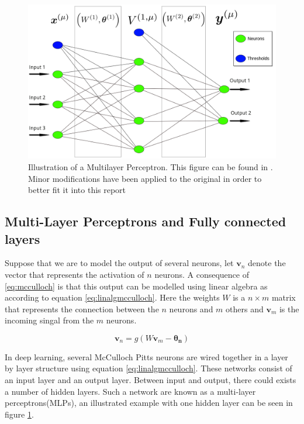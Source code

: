 \begin{figure}
    \centering
    \includegraphics[scale=1.3]{figure/neural_network1.png}
    \caption{Illustration of a Multilayer Perceptron. This figure can be found in \cite{barkdeep}. Minor modifications have been applied to the original in order to better fit it into this report}
    \label{fig:mlp}
\end{figure}

\subsection{Multi-Layer Perceptrons and Fully connected layers}

Suppose that we are to model the output of several neurons, let $\boldsymbol{v}_n$ denote the vector that represents the activation of $n$ neurons. A consequence of \eqref{eq:mcculloch} is that this output can be modelled using linear algebra as according to equation \eqref{eq:linalgmcculloch}. Here the weights $W$ is a $n \times m$ matrix that represents the connection between the $n$ neurons and $m$ others and $\boldsymbol{v}_m$ is the incoming singal from the $m$ neurons\cite{mehligcourseslides}. 

\begin{equation}
    \label{eq:linalgmcculloch}
    \boldsymbol{v}_n = g(W\boldsymbol{v}_m-\boldsymbol{\theta_n})
\end{equation}

In deep learning, several McCulloch Pitts neurons are wired together in a layer by layer structure using equation \eqref{eq:linalgmcculloch}. These networks consist of an input layer and an output layer. Between input and output, there could exists a number of hidden layers. Such a network are known as a multi-layer perceptrons(MLPs)\cite{mehligcourseslides}, an illustrated example with one hidden layer can be seen in figure \ref{fig:mlp}.

